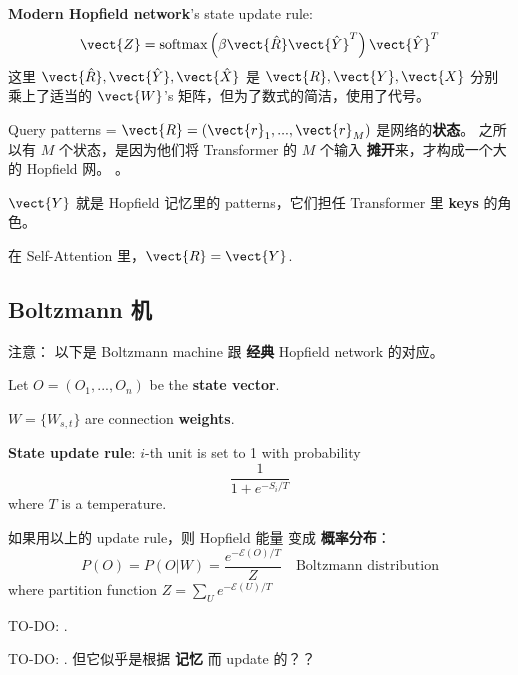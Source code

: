 \begin{preview}
\begin{minipage}{\textwidth}
\textbf{Modern Hopfield network}'s state update rule:
\begin{equation}
\vect{Z} = \mbox{softmax} \left( \beta \vect{\hat{R}} \vect{\hat{Y}}^T \right) \vect{\hat{Y}}^T
\end{equation}
这里 $\vect{\hat{R}}, \vect{\hat{Y}}, \vect{\hat{X}}$ 是 $\vect{R}, \vect{Y}, \vect{X}$ 分别乘上了适当的 $\vect{W}$'s 矩阵，但为了数式的简洁，使用了代号。

Query patterns = $\vect{R} = (\vect{r}_1, ... , \vect{r}_M)$ 是网络的\textbf{状态}。 之所以有 $M$ 个状态，是因为他们将 Transformer 的 $M$ 个输入 \textbf{摊开}来，才构成一个大的 Hopfield 网。 。

$\vect{Y}$ 就是 Hopfield 记忆里的 patterns，它们担任 Transformer 里 \textbf{keys} 的角色。

在 Self-Attention 里，$\vect{R} = \vect{Y}$.

\subsection{Boltzmann 机}

注意： 以下是 Boltzmann machine 跟 \textbf{经典} Hopfield network 的对应。

Let $O = (O_1, ..., O_n)$ be the \textbf{state vector}.

$W = \{ W_{s,t} \}$ are connection \textbf{weights}.

\textbf{State update rule}:  $i$-th unit is set to 1 with probability
\begin{equation}
\frac{1}{1 + e^{- S_i / T}}
\end{equation}
where $T$ is a temperature.

如果用以上的 update rule，则 Hopfield 能量 变成 \textbf{概率分布}：
\begin{equation}
P(O) = P(O|W) = \frac{e^{-\mathcal{E}(O)/T}}{Z} \quad \boxed{\mbox{Boltzmann distribution}}
\end{equation}
where partition function $\displaystyle Z = \sum_U e^{-\mathcal{E}(U)/T} $

{\color{red}TO-DO:} .


{\color{red}TO-DO:} .  但它似乎是根据 \textbf{记忆} 而 update 的？？

\end{minipage}
\end{preview}

